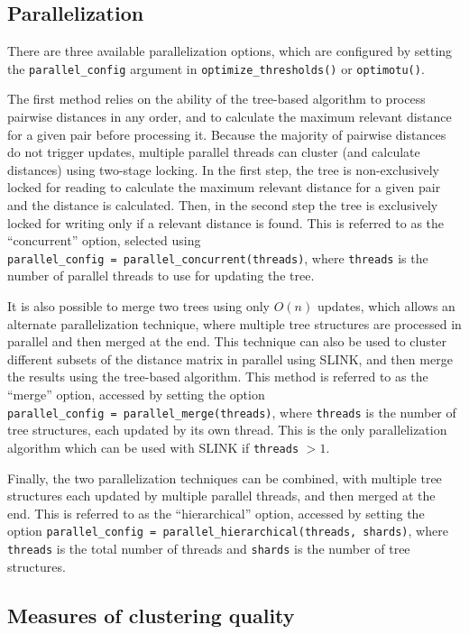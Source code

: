 \documentclass[
]{article}
\begin{document}
\subsection{Parallelization}\label{parallelization}

There are three available parallelization options, which are configured by setting the \texttt{parallel\_config} argument in \texttt{optimize\_thresholds()} or \texttt{optimotu()}.

The first method relies on the ability of the tree-based algorithm to process pairwise distances in any order, and to calculate the maximum relevant distance for a given pair before processing it.
Because the majority of pairwise distances do not trigger updates, multiple parallel threads can cluster (and calculate distances) using two-stage locking.
In the first step, the tree is non-exclusively locked for reading to calculate the maximum relevant distance for a given pair and the distance is calculated.
Then, in the second step the tree is exclusively locked for writing only if a relevant distance is found.
This is referred to as the ``concurrent'' option, selected using \texttt{parallel\_config\ =\ parallel\_concurrent(threads)}, where \texttt{threads} is the number of parallel threads to use for updating the tree.

It is also possible to merge two trees using only \(O(n)\) updates, which allows an alternate parallelization technique, where multiple tree structures are processed in parallel and then merged at the end.
This technique can also be used to cluster different subsets of the distance matrix in parallel using SLINK, and then merge the results using the tree-based algorithm.
This method is referred to as the ``merge'' option, accessed by setting the option \texttt{parallel\_config\ =\ parallel\_merge(threads)}, where \texttt{threads} is the number of tree structures, each updated by its own thread.
This is the only parallelization algorithm which can be used with SLINK if \texttt{threads} \(> 1\).

Finally, the two parallelization techniques can be combined, with multiple tree structures each updated by multiple parallel threads, and then merged at the end.
This is referred to as the ``hierarchical'' option, accessed by setting the option \texttt{parallel\_config\ =\ parallel\_hierarchical(threads,\ shards)}, where \texttt{threads} is the total number of threads and \texttt{shards} is the number of tree structures.

\subsection{Measures of clustering quality}\label{measures-of-clustering-quality}
\end{document}
